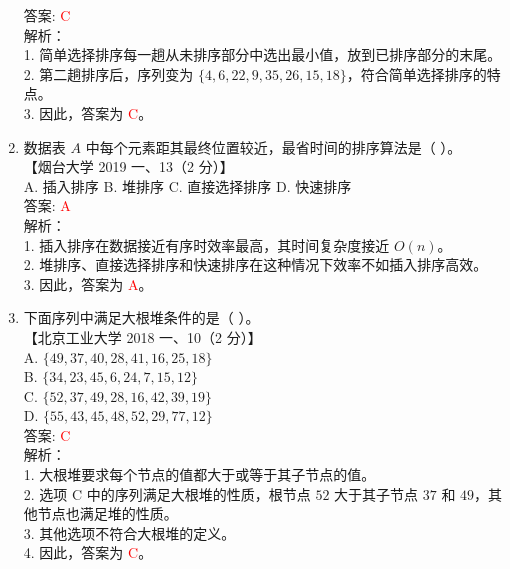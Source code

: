 \documentclass[lang=cn,newtx,10pt,scheme=chinese]{../../../elegantbook}
\begin{document}
\begin{enumerate}
    答案: \textcolor{red}{C} \\

    解析：\\
    1. 简单选择排序每一趟从未排序部分中选出最小值，放到已排序部分的末尾。\\
    2. 第二趟排序后，序列变为 $\{4, 6, 22, 9, 35, 26, 15, 18\}$，符合简单选择排序的特点。\\
    3. 因此，答案为 \textcolor{red}{C}。\\

\item 数据表 $A$ 中每个元素距其最终位置较近，最省时间的排序算法是（ ）。\\
    【烟台大学 2019 一、13（2 分）】\\  

    A. 插入排序 \quad B. 堆排序 \quad C. 直接选择排序 \quad D. 快速排序 \\  

    答案: \textcolor{red}{A} \\

    解析：\\
    1. 插入排序在数据接近有序时效率最高，其时间复杂度接近 $O(n)$。\\
    2. 堆排序、直接选择排序和快速排序在这种情况下效率不如插入排序高效。\\
    3. 因此，答案为 \textcolor{red}{A}。\\

\item 下面序列中满足大根堆条件的是（ ）。\\
    【北京工业大学 2018 一、10（2 分）】\\  

    A. $\{49, 37, 40, 28, 41, 16, 25, 18\}$ \\  
    B. $\{34, 23, 45, 6, 24, 7, 15, 12\}$ \\  
    C. $\{52, 37, 49, 28, 16, 42, 39, 19\}$ \\  
    D. $\{55, 43, 45, 48, 52, 29, 77, 12\}$ \\  

    答案: \textcolor{red}{C} \\

    解析：\\
    1. 大根堆要求每个节点的值都大于或等于其子节点的值。\\
    2. 选项 C 中的序列满足大根堆的性质，根节点 $52$ 大于其子节点 $37$ 和 $49$，其他节点也满足堆的性质。\\
    3. 其他选项不符合大根堆的定义。\\
    4. 因此，答案为 \textcolor{red}{C}。\\
\end{enumerate}
\end{document}
